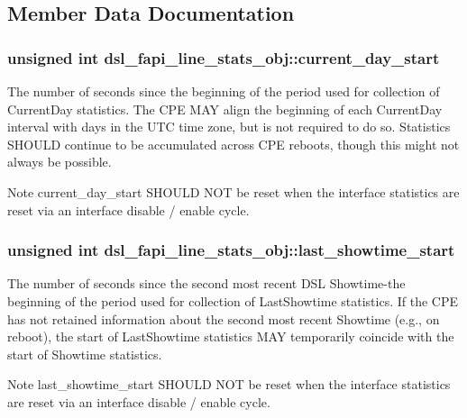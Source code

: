 \subsection{Member Data Documentation}
\hypertarget{structdsl__fapi__line__stats__obj_a49cd48f81418660fca1de5040e0c92b3}{
\subsubsection[{current\-\_\-day\-\_\-start}]{\setlength{\rightskip}{0pt plus 5cm}unsigned int dsl\-\_\-fapi\-\_\-line\-\_\-stats\-\_\-obj\-::current\-\_\-day\-\_\-start}}\label{structdsl__fapi__line__stats__obj_a49cd48f81418660fca1de5040e0c92b3}
The number of seconds since the beginning of the period used for collection of Current\-Day statistics. The C\-P\-E M\-A\-Y align the beginning of each Current\-Day interval with days in the U\-T\-C time zone, but is not required to do so. Statistics S\-H\-O\-U\-L\-D continue to be accumulated across C\-P\-E reboots, though this might not always be possible. \begin{DoxyNote}{Note}
current\-\_\-day\-\_\-start S\-H\-O\-U\-L\-D N\-O\-T be reset when the interface statistics are reset via an interface disable / enable cycle. 
\end{DoxyNote}
\hypertarget{structdsl__fapi__line__stats__obj_a4716069edab0bee87955a7db1836f951}{
\subsubsection[{last\-\_\-showtime\-\_\-start}]{\setlength{\rightskip}{0pt plus 5cm}unsigned int dsl\-\_\-fapi\-\_\-line\-\_\-stats\-\_\-obj\-::last\-\_\-showtime\-\_\-start}}\label{structdsl__fapi__line__stats__obj_a4716069edab0bee87955a7db1836f951}
The number of seconds since the second most recent D\-S\-L Showtime-\/the beginning of the period used for collection of Last\-Showtime statistics. If the C\-P\-E has not retained information about the second most recent Showtime (e.\-g., on reboot), the start of Last\-Showtime statistics M\-A\-Y temporarily coincide with the start of Showtime statistics. \begin{DoxyNote}{Note}
last\-\_\-showtime\-\_\-start S\-H\-O\-U\-L\-D N\-O\-T be reset when the interface statistics are reset via an interface disable / enable cycle. 
\end{DoxyNote}
